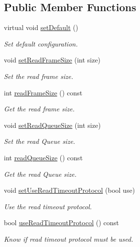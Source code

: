 \subsection*{Public Member Functions}
\begin{DoxyCompactItemize}
\item 
virtual void \hyperlink{classmdt_port_config_a1cad2f21252411977fe328f89b68fbfb}{setDefault} ()
\begin{DoxyCompactList}\small\item\em Set default configuration. \end{DoxyCompactList}\item 
void \hyperlink{classmdt_port_config_a02f3c9744b0d7a61853ab58467278bbc}{setReadFrameSize} (int size)
\begin{DoxyCompactList}\small\item\em Set the read frame size. \end{DoxyCompactList}\item 
int \hyperlink{classmdt_port_config_ad315f8f97723abe161792c9d9a1375ec}{readFrameSize} () const 
\begin{DoxyCompactList}\small\item\em Get the read frame size. \end{DoxyCompactList}\item 
void \hyperlink{classmdt_port_config_a04d8e81844deaff20a890ea24e2f9634}{setReadQueueSize} (int size)
\begin{DoxyCompactList}\small\item\em Set the read Queue size. \end{DoxyCompactList}\item 
int \hyperlink{classmdt_port_config_aff0260f72ca05715efe3f70850e7a151}{readQueueSize} () const 
\begin{DoxyCompactList}\small\item\em Get the read Queue size. \end{DoxyCompactList}\item 
void \hyperlink{classmdt_port_config_a5e7857a56ab2baff4bd0a77290b3c742}{setUseReadTimeoutProtocol} (bool use)
\begin{DoxyCompactList}\small\item\em Use the read timeout protocol. \end{DoxyCompactList}\item 
bool \hyperlink{classmdt_port_config_ad90a88b06f0efebd1ee9f6d4370dec33}{useReadTimeoutProtocol} () const 
\begin{DoxyCompactList}\small\item\em Know if read timeout protocol must be used. \end{DoxyCompactList}\item 

\end{DoxyCompactItemize}
